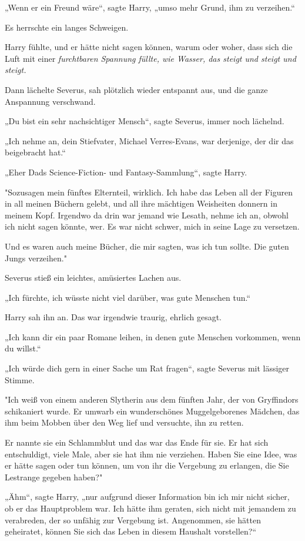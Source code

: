 {„Wenn er ein Freund wäre“, sagte Harry, „umso mehr Grund, ihm zu verzeihen.“

Es herrschte ein langes Schweigen.

Harry fühlte, und er hätte nicht sagen können, warum oder woher, dass sich die Luft mit einer \emph{furchtbaren Spannung füllte, wie Wasser, das steigt und steigt und steigt.}

Dann lächelte Severus, sah plötzlich wieder entspannt aus, und die ganze Anspannung verschwand.

„Du bist ein sehr nachsichtiger Mensch“, sagte Severus, immer noch lächelnd.

„Ich nehme an, dein Stiefvater, Michael Verres-Evans, war derjenige, der dir das beigebracht hat.“

„Eher Dads Science-Fiction- und Fantasy-Sammlung“, sagte Harry.

"Sozusagen mein fünftes Elternteil, wirklich. Ich habe das Leben all der Figuren in all meinen Büchern gelebt, und all ihre mächtigen Weisheiten donnern in meinem Kopf. Irgendwo da drin war jemand wie Lesath, nehme ich an, obwohl ich nicht sagen könnte, wer. Es war nicht schwer, mich in seine Lage zu versetzen.

Und es waren auch meine Bücher, die mir sagten, was ich tun sollte. Die guten Jungs verzeihen."

Severus stieß ein leichtes, amüsiertes Lachen aus.

„Ich fürchte, ich wüsste nicht viel darüber, was gute Menschen tun.“

Harry sah ihn an. Das war irgendwie traurig, ehrlich gesagt.

„Ich kann dir ein paar Romane leihen, in denen gute Menschen vorkommen, wenn du willst.“

„Ich würde dich gern in einer Sache um Rat fragen“, sagte Severus mit lässiger Stimme.

"Ich weiß von einem anderen Slytherin aus dem fünften Jahr, der von Gryffindors schikaniert wurde. Er umwarb ein wunderschönes Muggelgeborenes Mädchen, das ihm beim Mobben über den Weg lief und versuchte, ihn zu retten.

Er nannte sie ein Schlammblut und das war das Ende für sie. Er hat sich entschuldigt, viele Male, aber sie hat ihm nie verziehen. Haben Sie eine Idee, was er hätte sagen oder tun können, um von ihr die Vergebung zu erlangen, die Sie Lestrange gegeben haben?"

„Ähm“, sagte Harry, „nur aufgrund dieser Information bin ich mir nicht sicher, ob er das Hauptproblem war. Ich hätte ihm geraten, sich nicht mit jemandem zu verabreden, der so unfähig zur Vergebung ist. Angenommen, sie hätten geheiratet, können Sie sich das Leben in diesem Haushalt vorstellen?“

}
